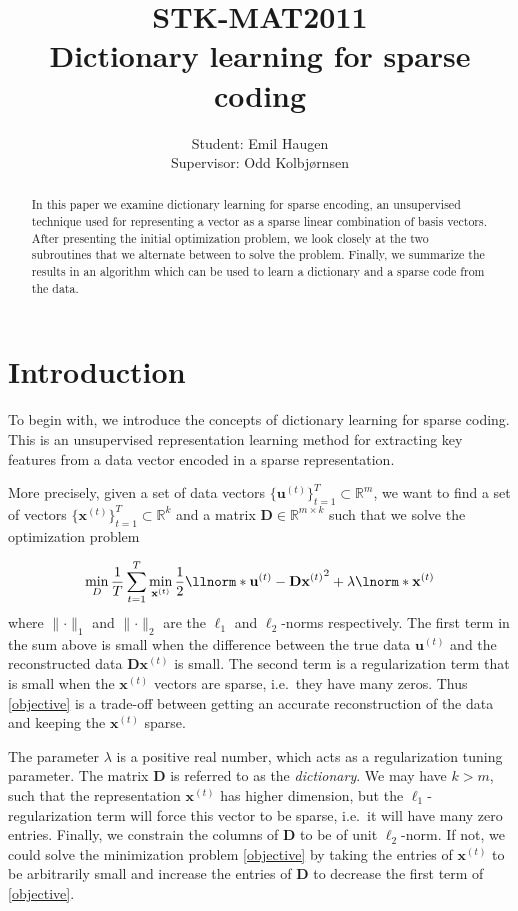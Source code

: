 \documentclass[a4paper, article, oneside, UKenglish]{memoir}
\title{STK-MAT2011 \\ Dictionary learning for sparse coding}
\author{Student: Emil Haugen \\ Supervisor: Odd Kolbjørnsen}
\newcommand{\R}{\mathbb{R}}   %
\newcommand{\0}{\mathbf{0}}
\newcommand{\1}{\mathbf{1}}
\newcommand{\D}{\mathbf{D}}
\newcommand{\xt}{\mathbf{x}^{(t)}}
\newcommand{\ut}{\mathbf{u}^{(t)}}
\newcommand{\norms}[2]{\lVert #1 \rVert_{#2}}
\begin{document}
\maketitle


\begin{abstract}
    \noindent
    In this paper we examine dictionary learning for sparse encoding, an unsupervised technique used for representing a vector as a sparse linear combination of basis vectors. After presenting the initial optimization problem, we look closely at the two subroutines that we alternate between to solve the problem. Finally, we summarize the results in an algorithm which can be used to learn a dictionary and a sparse code from the data. 
\end{abstract}


\chapter{Introduction}


To begin with, we introduce the concepts of dictionary learning for sparse coding. This is an unsupervised representation learning method for extracting key features from a data vector encoded in a sparse representation. 

More precisely, given a set of data vectors $\{\ut\}_{t=1}^T \subset \R^m$, we want to find a set of vectors $\{\xt\}_{t=1}^T \subset \R^k$ and a matrix $\D \in \R^{m \times k}$ such that we solve the optimization problem

\begin{equation} \label{objective}
    \min_D 
        \frac{1}{T} \sum_{t=1}^{T} 
                        \min_{\xt} \frac{1}{2}
                        \llnorm*{\ut - \D \xt}^2
                        + \lambda \lnorm*{\xt} 
\end{equation}
where $\norms{\cdot}{1}$ and $\norms{\cdot}{2}$ are the $\ell_1$ and $\ell_2$-norms respectively. The first term in the sum above is small when the difference between the true data $\ut$ and the reconstructed data $\D \xt$ is small. The second term is a regularization term that is small when the $\xt$ vectors are sparse, i.e.\ they have many zeros. Thus \eqref{objective} is a trade-off between getting an accurate reconstruction of the data and keeping the $\xt$ sparse. 

The parameter $\lambda$ is a positive real number, which acts as a regularization tuning parameter. The matrix $\D$ is referred to as the \emph{dictionary}. We may have $k > m$, such that the representation $\xt$ has higher dimension, but the $\ell_1$- regularization term will force this vector to be sparse, i.e.\ it will have many zero entries. Finally, we constrain the columns of $\D$ to be of unit $\ell_2$-norm. If not, we could solve the minimization problem \eqref{objective} by taking the entries of $\xt$ to be arbitrarily small and increase the entries of $\D$ to decrease the first term of \eqref{objective}.
\end{document}
